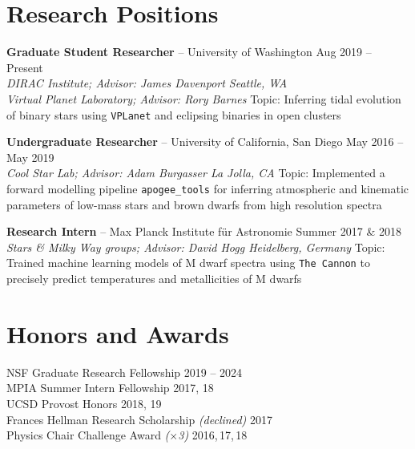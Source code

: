 \documentclass[margin,line]{resume}
\begin{document}
\begin{resume}

\section{\mysidestyle \textcolor{bcolor}{Research Positions}}

\textbf{Graduate Student Researcher} -- University of Washington \hfill Aug 2019 -- Present \\
\textsl{DIRAC Institute; Advisor: James Davenport \hfill Seattle, WA} \\
\textsl{Virtual Planet Laboratory; Advisor: Rory Barnes} 
\vspace{.1cm} \newline
Topic: Inferring tidal evolution of binary stars using \texttt{VPLanet} and eclipsing binaries in open clusters

\textbf{Undergraduate Researcher} -- University of California, San Diego \hfill May 2016 -- May 2019  \\
\textsl{Cool Star Lab; Advisor: Adam Burgasser \hfill La Jolla, CA} 
\vspace{.1cm} \newline
Topic: Implemented a forward modelling pipeline \texttt{apogee\_tools} for inferring atmospheric and kinematic parameters of low-mass stars and brown dwarfs from high resolution spectra

\textbf{Research Intern} -- Max Planck Institute f{\"u}r Astronomie \hfill Summer 2017 \& 2018 \\
\textsl{Stars \& Milky Way groups; Advisor: David Hogg \hfill Heidelberg, Germany} 
\vspace{.1cm} \newline
Topic: Trained machine learning models of M dwarf spectra using \texttt{The Cannon} to precisely predict temperatures and metallicities of M dwarfs


\section{\mysidestyle \textcolor{bcolor}{Honors and Awards}}
NSF Graduate Research Fellowship \hfill 2019 -- 2024 \\
MPIA Summer Intern Fellowship \hfill 2017, 18 \\
UCSD Provost Honors \hfill 2018, 19 \\
Frances Hellman Research Scholarship \textit{(declined)} \hfill 2017 \\
Physics Chair Challenge Award \textit{($\times$3)} \hfill 2016,\,17,\,18 



\end{resume}
\end{document}

